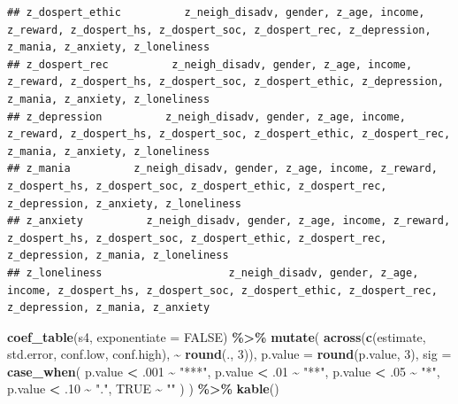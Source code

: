 \documentclass[
]{article}
\newenvironment{Shaded}{\begin{snugshade}}{\end{snugshade}}
\newcommand{\AttributeTok}[1]{\textcolor[rgb]{0.13,0.29,0.53}{#1}}
\newcommand{\ConstantTok}[1]{\textcolor[rgb]{0.56,0.35,0.01}{#1}}
\newcommand{\DecValTok}[1]{\textcolor[rgb]{0.00,0.00,0.81}{#1}}
\newcommand{\FunctionTok}[1]{\textcolor[rgb]{0.13,0.29,0.53}{\textbf{#1}}}
\newcommand{\NormalTok}[1]{#1}
\newcommand{\SpecialCharTok}[1]{\textcolor[rgb]{0.81,0.36,0.00}{\textbf{#1}}}
\newcommand{\StringTok}[1]{\textcolor[rgb]{0.31,0.60,0.02}{#1}}
\begin{document}
\begin{verbatim}
## z_dospert_ethic          z_neigh_disadv, gender, z_age, income, z_reward, z_dospert_hs, z_dospert_soc, z_dospert_rec, z_depression, z_mania, z_anxiety, z_loneliness
## z_dospert_rec          z_neigh_disadv, gender, z_age, income, z_reward, z_dospert_hs, z_dospert_soc, z_dospert_ethic, z_depression, z_mania, z_anxiety, z_loneliness
## z_depression          z_neigh_disadv, gender, z_age, income, z_reward, z_dospert_hs, z_dospert_soc, z_dospert_ethic, z_dospert_rec, z_mania, z_anxiety, z_loneliness
## z_mania          z_neigh_disadv, gender, z_age, income, z_reward, z_dospert_hs, z_dospert_soc, z_dospert_ethic, z_dospert_rec, z_depression, z_anxiety, z_loneliness
## z_anxiety          z_neigh_disadv, gender, z_age, income, z_reward, z_dospert_hs, z_dospert_soc, z_dospert_ethic, z_dospert_rec, z_depression, z_mania, z_loneliness
## z_loneliness                    z_neigh_disadv, gender, z_age, income, z_dospert_hs, z_dospert_soc, z_dospert_ethic, z_dospert_rec, z_depression, z_mania, z_anxiety
\end{verbatim}

\begin{Shaded}
\begin{Highlighting}[]
\FunctionTok{coef\_table}\NormalTok{(s4, }\AttributeTok{exponentiate =} \ConstantTok{FALSE}\NormalTok{) }\SpecialCharTok{\%\textgreater{}\%}
  \FunctionTok{mutate}\NormalTok{(}
    \FunctionTok{across}\NormalTok{(}\FunctionTok{c}\NormalTok{(estimate, std.error, conf.low, conf.high), }\SpecialCharTok{\textasciitilde{}} \FunctionTok{round}\NormalTok{(., }\DecValTok{3}\NormalTok{)),}
    \AttributeTok{p.value =} \FunctionTok{round}\NormalTok{(p.value, }\DecValTok{3}\NormalTok{),}
    \AttributeTok{sig =} \FunctionTok{case\_when}\NormalTok{(}
\NormalTok{      p.value }\SpecialCharTok{\textless{}}\NormalTok{ .}\DecValTok{001} \SpecialCharTok{\textasciitilde{}} \StringTok{"***"}\NormalTok{,}
\NormalTok{      p.value }\SpecialCharTok{\textless{}}\NormalTok{ .}\DecValTok{01}  \SpecialCharTok{\textasciitilde{}} \StringTok{"**"}\NormalTok{,}
\NormalTok{      p.value }\SpecialCharTok{\textless{}}\NormalTok{ .}\DecValTok{05}  \SpecialCharTok{\textasciitilde{}} \StringTok{"*"}\NormalTok{,}
\NormalTok{      p.value }\SpecialCharTok{\textless{}}\NormalTok{ .}\DecValTok{10}  \SpecialCharTok{\textasciitilde{}} \StringTok{"."}\NormalTok{,}
      \ConstantTok{TRUE} \SpecialCharTok{\textasciitilde{}} \StringTok{""}
\NormalTok{    )}
\NormalTok{  ) }\SpecialCharTok{\%\textgreater{}\%}
  \FunctionTok{kable}\NormalTok{()}
\end{Highlighting}
\end{Shaded}
\end{document}
